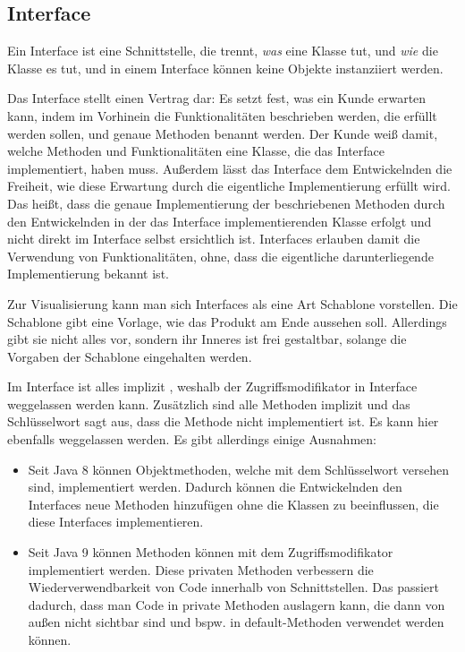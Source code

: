 \documentclass{tuda-pub}
\begin{document}
  \subsection{Interface}
  Ein Interface ist eine Schnittstelle, die trennt, \emph{was} eine Klasse tut, und \emph{wie}
  die Klasse es tut, und in einem Interface können keine Objekte instanziiert werden.

  \br

  Das Interface stellt einen Vertrag dar: Es setzt fest, was ein Kunde erwarten kann, indem im
  Vorhinein die Funktionalitäten beschrieben werden, die erfüllt werden sollen, und genaue
  Methoden benannt werden. Der Kunde weiß damit, welche Methoden und Funktionalitäten eine
  Klasse, die das Interface implementiert, haben muss. Außerdem lässt das Interface dem
  Entwickelnden die Freiheit, wie diese Erwartung durch die eigentliche Implementierung erfüllt
  wird. Das heißt, dass die genaue Implementierung der beschriebenen Methoden durch den
  Entwickelnden in der das Interface implementierenden Klasse erfolgt und nicht direkt im
  Interface selbst ersichtlich ist. Interfaces erlauben damit die Verwendung von
  Funktionalitäten, ohne, dass die eigentliche darunterliegende Implementierung bekannt ist.

  \br

  Zur Visualisierung kann man sich Interfaces als eine Art Schablone vorstellen.
  Die Schablone gibt eine Vorlage, wie das Produkt am Ende aussehen soll. Allerdings gibt sie
  nicht alles vor, sondern ihr Inneres ist frei gestaltbar, solange die Vorgaben der Schablone
  eingehalten werden.

  \br

  Im Interface ist alles implizit , weshalb der Zugriffsmodifikator in
  Interface weggelassen werden kann. Zusätzlich sind alle Methoden implizit 
  und das Schlüsselwort  sagt aus, dass die Methode nicht implementiert ist.
  Es kann hier ebenfalls weggelassen werden. Es gibt allerdings einige Ausnahmen:

  \begin{itemize}
    \item Seit Java 8 können Objektmethoden, welche mit dem Schlüsselwort 
    versehen sind, implementiert werden. Dadurch können die Entwickelnden den Interfaces neue
    Methoden hinzufügen ohne die Klassen zu beeinflussen, die diese Interfaces implementieren.
    \item Seit Java 9 können Methoden können mit dem Zugriffsmodifikator 
    implementiert werden. Diese privaten Methoden verbessern die Wiederverwendbarkeit von Code
    innerhalb von Schnittstellen. Das passiert dadurch, dass man Code in private Methoden
    auslagern kann, die dann von außen nicht sichtbar sind und bspw. in default-Methoden
    verwendet werden können.
  \end{itemize}
\end{document}
